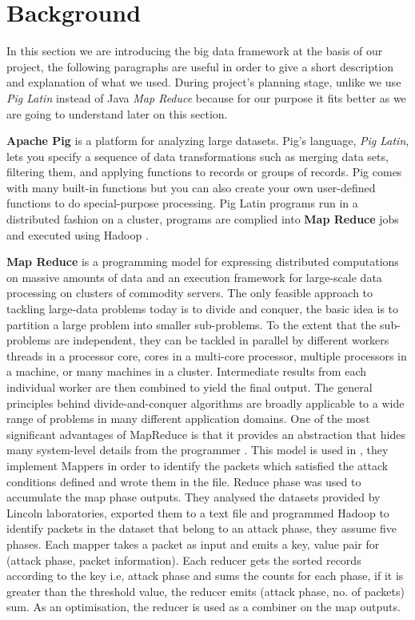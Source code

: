 \section{Background}
\label{sec:backg}
In this section we are introducing the big data framework at the basis of our project, the following paragraphs are useful in order to give a short description and explanation of what we used.  
During project's planning stage, unlike \cite{ddos_forensics} we use \textit{Pig Latin} instead of Java \textit{Map Reduce} because for our purpose it fits better as we are going to understand later on this section. 

\textbf{Apache Pig} is a platform for analyzing large datasets. Pig's language, \textit{Pig Latin}, lets you specify a sequence of data transformations such as merging data sets, filtering them, and applying functions to records or groups of records. Pig comes with many built-in functions but you can also create your own user-defined functions to do special-purpose processing.
Pig Latin programs run in a distributed fashion on a cluster, programs are complied into \textbf{Map Reduce} jobs and executed using Hadoop \cite{pig_wiki}.

\textbf{Map Reduce} is a programming model for expressing distributed computations on massive amounts of data and an execution framework for large-scale data processing on clusters of commodity servers. The only feasible approach to tackling large-data problems today is to divide and conquer, the basic idea is to partition a large problem into smaller sub-problems. To the extent that the sub-problems are independent, they can be tackled in parallel by different workers  threads in a processor core, cores in a multi-core processor, multiple processors in a machine, or many machines in a cluster. Intermediate results from each individual worker are then combined to yield the final output.
The general principles behind divide-and-conquer algorithms are broadly applicable to a wide range of problems in many different application domains. One of the most significant advantages of MapReduce is that it provides an abstraction that hides many system-level details from the programmer \cite{jimmy_lin}. This model is used in \cite{ddos_forensics}, they implement Mappers in order to identify the packets which satisfied the attack conditions defined and wrote them in the file. Reduce phase was used to accumulate the map phase outputs. They analysed the datasets provided by Lincoln laboratories, exported them to a text file and programmed Hadoop to identify packets in the dataset that belong to an attack phase, they assume five phases. Each mapper takes a packet as input and emits a key, value pair for (attack phase, packet information). 
Each reducer gets the sorted records according to the key i.e, attack phase and sums the counts for each phase, if it is greater than the threshold value, the reducer emits (attack phase, no. of packets) sum. As an optimisation, the reducer is used as a combiner on the map outputs.

